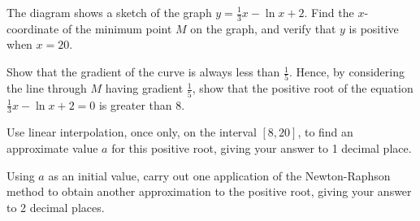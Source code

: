 \begin{problem}
    \begin{center}
    \end{center}

    The diagram shows a sketch of the graph $y = \frac13 x - \ln{x+2}$. Find the $x$-coordinate of the minimum point $M$ on the graph, and verify that $y$ is positive when $x = 20$.

    Show that the gradient of the curve is always less than $\frac15$. Hence, by considering the line through $M$ having gradient $\frac15$, show that the positive root of the equation $\frac13 x - \ln{x+2} = 0$ is greater than 8.

    Use linear interpolation, once only, on the interval $[8, 20]$, to find an approximate value $a$ for this positive root, giving your answer to 1 decimal place.

    Using $a$ as an initial value, carry out one application of the Newton-Raphson method to obtain another approximation to the positive root, giving your answer to 2 decimal places.
\end{problem}
